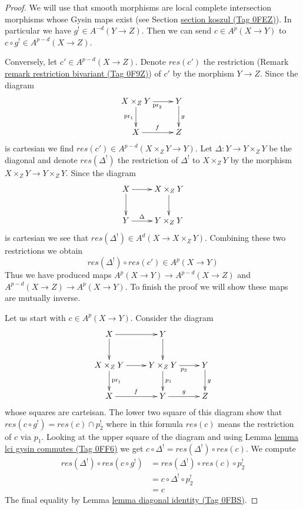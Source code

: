 \documentclass{amsart}
\theoremstyle{plain}
\theoremstyle{definition}
\theoremstyle{remark}
\numberwithin{equation}{subsection}
\begin{document}
\begin{proof}
We will use that smooth morphisms are local complete intersection
morphisms whose Gysin maps exist (see Section \href{https://stacks.math.columbia.edu/tag/0FEZ}{section koszul (Tag 0FEZ)}).
In particular we have $g^! \in A^{-d}(Y \to Z)$. Then we can send
$c \in A^p(X \to Y)$ to $c \circ g^! \in A^{p - d}(X \to Z)$.

\medskip\noindent
Conversely, let $c' \in A^{p - d}(X \to Z)$. Denote $res(c')$ the restriction
(Remark \href{https://stacks.math.columbia.edu/tag/0F9Z}{remark restriction bivariant (Tag 0F9Z)}) of $c'$ by the morphism $Y \to Z$.
Since the diagram
$$
\xymatrix{
X \times_Z Y \ar[r]_{\text{pr}_2} \ar[d]_{\text{pr}_1} & Y \ar[d]^g \\
X \ar[r]^f & Z
}
$$
is cartesian we find $res(c') \in A^{p - d}(X \times_Z Y \to Y)$.
Let $\Delta : Y \to Y \times_Z Y$ be the diagonal and denote
$res(\Delta^!)$ the restriction of $\Delta^!$
to $X \times_Z Y$ by the morphism $X \times_Z Y \to Y \times_Z Y$.
Since the diagram
$$
\xymatrix{
X \ar[r] \ar[d] & X \times_Z Y \ar[d] \\
Y \ar[r]^-\Delta & Y \times_Z Y
}
$$
is cartesian we see that $res(\Delta^!) \in A^d(X \to X \times_Z Y)$.
Combining these two restrictions we obtain
$$
res(\Delta^!) \circ res(c') \in A^p(X \to Y)
$$
Thus we have produced maps $A^p(X \to Y) \to A^{p - d}(X \to Z)$
and $A^{p - d}(X \to Z) \to A^p(X \to Y)$. To finish the proof we
will show these maps are mutually inverse.

\medskip\noindent
Let us start with $c \in A^p(X \to Y)$. Consider the diagram
$$
\xymatrix{
X \ar[d] \ar[r] & Y \ar[d] \\
X \times_Z Y \ar[r] \ar[d]^{\text{pr}_1} &
Y \times_Z Y \ar[r]_{p_2} \ar[d]^{p_1} &
Y \ar[d]^g \\
X \ar[r]^f &
Y \ar[r]^g &
Z
}
$$
whose squares are carteisan. The lower two square of this diagram
show that $res(c \circ g^!) = res(c) \cap p_2^!$ where in this formula
$res(c)$ means the restriction of $c$ via $p_1$. Looking at the upper
square of the diagram and using Lemma \href{https://stacks.math.columbia.edu/tag/0FF6}{lemma lci gysin commutes (Tag 0FF6)}
we get $c \circ \Delta^! = res(\Delta^!) \circ res(c)$.
We compute
\begin{align*}
res(\Delta^!) \circ res(c \circ g^!)
& =
res(\Delta^!) \circ res(c) \circ p_2^! \\
& =
c \circ \Delta^! \circ p_2^! \\
& =
c
\end{align*}
The final equality by Lemma \href{https://stacks.math.columbia.edu/tag/0FBS}{lemma diagonal identity (Tag 0FBS)}.


\end{proof}
\end{document}
